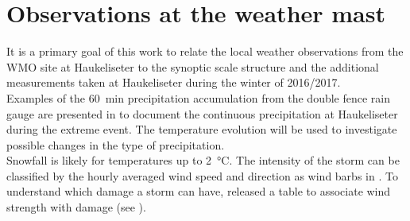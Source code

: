 \section{Observations at the weather mast}
\label{sec:loc_obs}
It is a primary goal of this work to relate the local weather observations from the WMO site at Haukeliseter to the synoptic scale structure and the additional measurements taken at Haukeliseter during the winter of 2016/2017.
\\
Examples of the \SI{60}{\minute} precipitation accumulation from the double fence rain gauge are presented in  to document the continuous precipitation at Haukeliseter during the extreme event. 
The temperature evolution will be used to investigate possible changes in the type of precipitation. 
\\
Snowfall is likely for temperatures up to \SI{2}{\celsius}. The intensity of the storm can be classified by the hourly averaged wind speed and direction as wind barbs in \SI{}{\mPs}.
To understand which damage a storm can have, \cite{faeraas_urd_2016} released a table to associate wind strength with damage (see ).

% 
